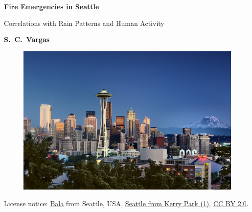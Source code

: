 \documentclass[12pt,a4paper]{article}
\date{}
\begin{document}
\thispagestyle{empty}

\begin{center}

\textsf{}

\vskip 1.2cm

{\LARGE \bf Fire Emergencies in Seattle}

\vskip 0.1cm

{\Large Correlations with Rain Patterns and Human Activity}
 

\vskip 0.75cm

{\bf \large S.~C.~Vargas}



\end{center}

\vskip 1cm


\begin{figure}[ht!]
\centering
\includegraphics[scale=0.5]{figs/Seattle_Pic.jpg}
\label{pic}
\end{figure}
\vspace{-0.8cm}
\begin{center}
{\small License notice: \href{https://www.flickr.com/people/43518209@N00}{Bala} from Seattle, USA, \href{https://commons.wikimedia.org/wiki/File:Seattle_from_Kerry_Park_(1).jpg}{Seattle from Kerry Park (1)}, \href{https://creativecommons.org/licenses/by/2.0/legalcode}{CC BY 2.0}.}
\end{center}
\end{document}

